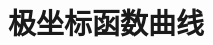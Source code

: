 \documentclass[../main.tex]{subfiles}
\begin{document}
\section{极坐标函数曲线}

 \hypertarget{tfpo}{}
%
%
%
%
\end{document}
